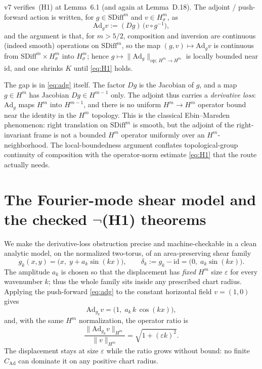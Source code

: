 \documentclass[11pt]{article}
\theoremstyle{definition}
\newcommand{\SDiff}{\mathrm{SDiff}}
\newcommand{\Ad}{\mathrm{Ad}}
\newcommand{\Hm}{H^m}
\newcommand{\Hms}{H^m_\sigma}
\newcommand{\CAd}{C_{\mathrm{Ad}}}
\begin{document}
v7 verifies~(H1) at Lemma~6.1 (and again at Lemma~D.18). The adjoint /
push-forward action is written, for $g\in\SDiff^m$ and $v\in\Hms$, as
\begin{equation}
  \Ad_g v := (Dg)\,\bigl(v\circ g^{-1}\bigr),
  \label{eq:adg}
\end{equation}
and the argument is that, for $m>5/2$, composition and inversion are continuous
(indeed smooth) operations on $\SDiff^m$, so the map $(g,v)\mapsto \Ad_g v$ is
continuous from $\SDiff^m\times\Hms$ into $\Hms$; hence
$g\mapsto\|\Ad_g\|_{\mathrm{op};\,\Hm\to\Hm}$ is locally bounded near
$\mathrm{id}$, and one shrinks $K$ until \eqref{eq:H1} holds.

The gap is in \eqref{eq:adg} itself. The factor $Dg$ is the Jacobian of $g$, and
a map $g\in\Hm$ has Jacobian $Dg\in H^{m-1}$ only. The adjoint thus carries a
\emph{derivative loss}: $\Ad_g$ maps $\Hm$ into $H^{m-1}$, and there is no
uniform $\Hm\to\Hm$ operator bound near the identity in the $\Hm$ topology.
This is the classical Ebin--Marsden phenomenon: right translation on
$\SDiff^m$ is smooth, but the adjoint of the right-invariant frame is not a
bounded $\Hm$ operator uniformly over an $\Hm$-neighborhood. The
local-boundedness argument conflates topological-group continuity of
composition with the operator-norm estimate \eqref{eq:H1} that the route
actually needs.

\section{The Fourier-mode shear model and the checked \texorpdfstring{$\neg$}{not}(H1) theorems}
\label{sec:lean}

We make the derivative-loss obstruction precise and machine-checkable in a clean
analytic model, on the normalized two-torus, of an area-preserving shear family
\[
  g_k(x,y) = \bigl(x,\; y + a_k \sin(kx)\bigr),
  \qquad
  \delta_k := g_k - \mathrm{id} = \bigl(0,\; a_k\sin(kx)\bigr).
\]
The amplitude $a_k$ is chosen so that the displacement has \emph{fixed} $\Hm$
size $\varepsilon$ for every wavenumber $k$; thus the whole family sits inside
any prescribed chart radius. Applying the push-forward \eqref{eq:adg} to the
constant horizontal field $v=(1,0)$ gives
\[
  \Ad_{g_k} v = \bigl(1,\; a_k\, k\, \cos(kx)\bigr),
\]
and, with the same $\Hm$ normalization, the operator ratio is
\[
  \frac{\|\Ad_{g_k}v\|_{\Hm}}{\|v\|_{\Hm}}
    = \sqrt{1+(\varepsilon k)^2}.
\]
The displacement stays at size $\varepsilon$ while the ratio grows without bound:
no finite $\CAd$ can dominate it on any positive chart radius.
\end{document}
